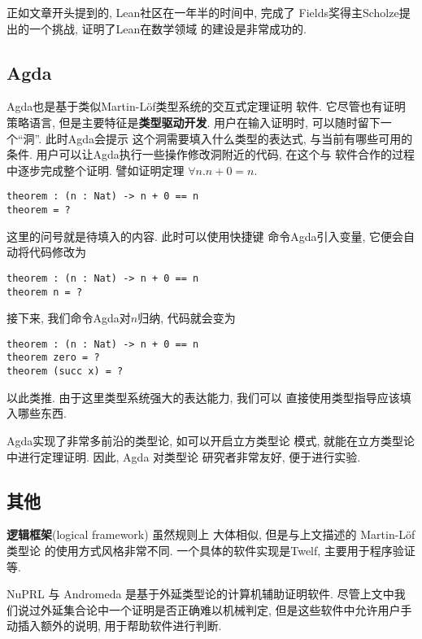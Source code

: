 正如文章开头提到的, Lean社区在一年半的时间中, 完成了
Fields奖得主Scholze提出的一个挑战, 证明了Lean在数学领域
的建设是非常成功的.

\subsection{Agda}

Agda也是基于类似Martin-L\"of类型系统的交互式定理证明
软件. 它尽管也有证明策略语言, 但是主要特征是\textbf{类型驱动开发}.
用户在输入证明时, 可以随时留下一个“洞”. 此时Agda会提示
这个洞需要填入什么类型的表达式, 与当前有哪些可用的条件.
用户可以让Agda执行一些操作修改洞附近的代码, 在这个与
软件合作的过程中逐步完成整个证明. 譬如证明定理
\(\forall n. n + 0 = n\).
\begin{verbatim}
theorem : (n : Nat) -> n + 0 == n
theorem = ?
\end{verbatim}
这里的问号就是待填入的内容. 此时可以使用快捷键
命令Agda引入变量, 它便会自动将代码修改为
\begin{verbatim}
theorem : (n : Nat) -> n + 0 == n
theorem n = ?
\end{verbatim}
接下来, 我们命令Agda对\(n\)归纳, 代码就会变为
\begin{verbatim}
theorem : (n : Nat) -> n + 0 == n
theorem zero = ?
theorem (succ x) = ?
\end{verbatim}
以此类推. 由于这里类型系统强大的表达能力, 我们可以
直接使用类型指导应该填入哪些东西.

Agda实现了非常多前沿的类型论, 如可以开启立方类型论
模式, 就能在立方类型论中进行定理证明. 因此, Agda 对类型论
研究者非常友好, 便于进行实验.

\subsection{其他}

\textbf{逻辑框架}(logical framework) 虽然规则上
大体相似, 但是与上文描述的 Martin-L\"of 类型论
的使用方式风格非常不同. 一个具体的软件实现是Twelf,
主要用于程序验证等.

NuPRL 与 Andromeda 是基于外延类型论的计算机辅助证明软件.
尽管上文中我们说过外延集合论中一个证明是否正确难以机械判定,
但是这些软件中允许用户手动插入额外的说明, 用于帮助软件进行判断.

